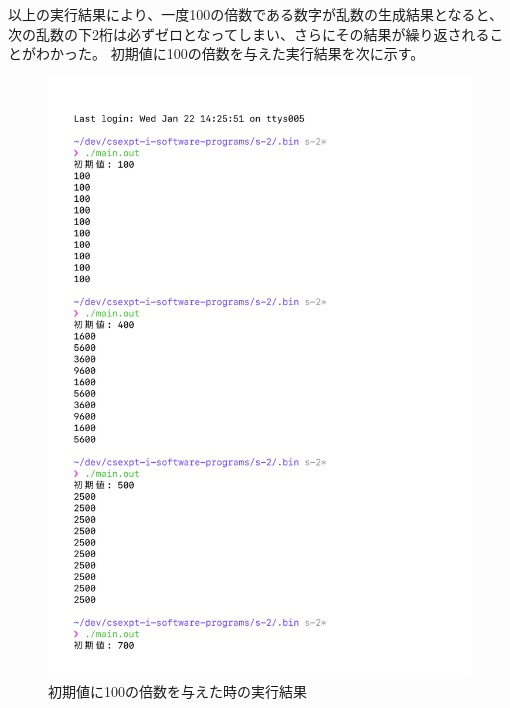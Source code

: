 以上の実行結果により、一度100の倍数である数字が乱数の生成結果となると、次の乱数の下2桁は必ずゼロとなってしまい、さらにその結果が繰り返されることがわかった。
初期値に100の倍数を与えた実行結果を次に示す。

% 
\begin{figure}[H]
    \centering
    \includegraphics[width=0.8\hsize, pagebox=mediabox, page=1]{main_result2_img.pdf}
    \caption{初期値に100の倍数を与えた時の実行結果}
    \label{初期値に100の倍数を与えた時の実行結果}
\end{figure}
